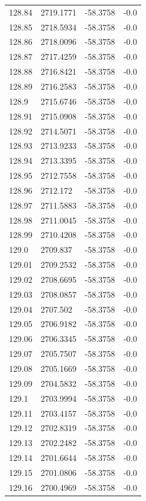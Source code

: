 \begin{table}[H]
\begin{tabular}{llll}
128.84 & 2719.1771 & -58.3758 & -0.0 \\
128.85 & 2718.5934 & -58.3758 & -0.0 \\
128.86 & 2718.0096 & -58.3758 & -0.0 \\
128.87 & 2717.4259 & -58.3758 & -0.0 \\
128.88 & 2716.8421 & -58.3758 & -0.0 \\
128.89 & 2716.2583 & -58.3758 & -0.0 \\
128.9 & 2715.6746 & -58.3758 & -0.0 \\
128.91 & 2715.0908 & -58.3758 & -0.0 \\
128.92 & 2714.5071 & -58.3758 & -0.0 \\
128.93 & 2713.9233 & -58.3758 & -0.0 \\
128.94 & 2713.3395 & -58.3758 & -0.0 \\
128.95 & 2712.7558 & -58.3758 & -0.0 \\
128.96 & 2712.172 & -58.3758 & -0.0 \\
128.97 & 2711.5883 & -58.3758 & -0.0 \\
128.98 & 2711.0045 & -58.3758 & -0.0 \\
128.99 & 2710.4208 & -58.3758 & -0.0 \\
129.0 & 2709.837 & -58.3758 & -0.0 \\
129.01 & 2709.2532 & -58.3758 & -0.0 \\
129.02 & 2708.6695 & -58.3758 & -0.0 \\
129.03 & 2708.0857 & -58.3758 & -0.0 \\
129.04 & 2707.502 & -58.3758 & -0.0 \\
129.05 & 2706.9182 & -58.3758 & -0.0 \\
129.06 & 2706.3345 & -58.3758 & -0.0 \\
129.07 & 2705.7507 & -58.3758 & -0.0 \\
129.08 & 2705.1669 & -58.3758 & -0.0 \\
129.09 & 2704.5832 & -58.3758 & -0.0 \\
129.1 & 2703.9994 & -58.3758 & -0.0 \\
129.11 & 2703.4157 & -58.3758 & -0.0 \\
129.12 & 2702.8319 & -58.3758 & -0.0 \\
129.13 & 2702.2482 & -58.3758 & -0.0 \\
129.14 & 2701.6644 & -58.3758 & -0.0 \\
129.15 & 2701.0806 & -58.3758 & -0.0 \\
129.16 & 2700.4969 & -58.3758 & -0.0 \\

\end{tabular}
\end{table}
